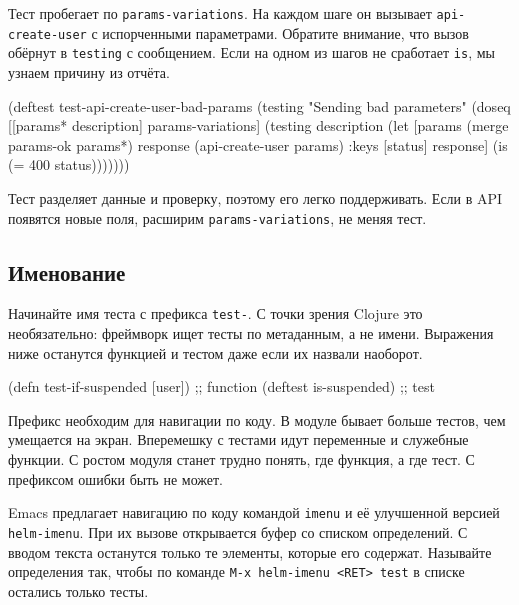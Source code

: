 Тест пробегает по \verb|params-variations|. На каждом шаге он вызывает
\verb|api-create-user| с испорченными параметрами. Обратите внимание, что
вызов обёрнут в \verb|testing| с сообщением. Если на одном из шагов не
сработает \verb|is|, мы узнаем причину из отчёта.

\begin{english}
  \begin{clojure}
(deftest test-api-create-user-bad-params
  (testing "Sending bad parameters"
    (doseq [[params* description] params-variations]
      (testing description
        (let [params (merge params-ok params*)
              response (api-create-user params)
              {:keys [status]} response]
          (is (= 400 status)))))))
  \end{clojure}
\end{english}

Тест разделяет данные и проверку, поэтому его легко поддерживать. Если в API
появятся новые поля, расширим \verb|params-variations|, не меняя тест.

\subsection{Именование}


Начинайте имя теста с префикса \verb|test-|. С точки зрения Clojure это
необязательно: фреймворк ищет тесты по метаданным, а не имени. Выражения ниже
останутся функцией и тестом даже если их назвали наоборот.

\begin{english}
  \begin{clojure}
(defn test-if-suspended [user]) ;; function
(deftest is-suspended)          ;; test
  \end{clojure}
\end{english}

Префикс необходим для навигации по коду. В модуле бывает больше тестов, чем
умещается на экран. Вперемешку с тестами идут переменные и служебные функции. С
ростом модуля станет трудно понять, где функция, а где тест. С префиксом ошибки
быть не может.


Emacs предлагает навигацию по коду командой \verb|imenu| и её улучшенной
версией \verb|helm-imenu|. При их вызове открывается буфер со списком
определений. С вводом текста останутся только те элементы, которые его
содержат. Называйте определения так, чтобы по команде \verb|M-x helm-imenu <RET> test|
в списке остались только тесты.

